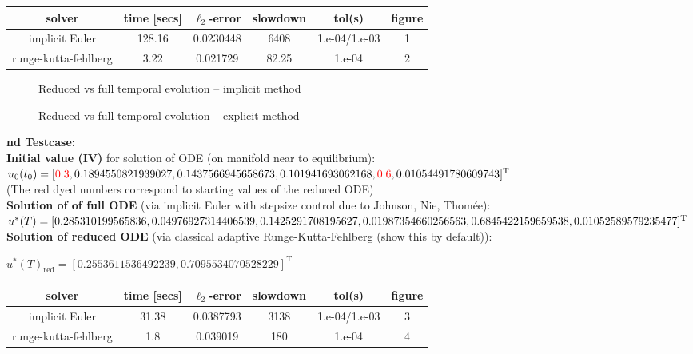 \documentclass[11pt,a4paper]{article}
\newcommand{\trans}{^{\operatorname{T}}}
\newcommand{\dyeitred}{\textcolor{red}}{}
\begin{document}
\begin{center}
  \begin{tabular}{|c|c|c|c|c||c|}
    \hline 
    \textbf{solver} &  \textbf{time [secs]} & \textbf{$\ell_2$-error} & \textbf{slowdown} & \textbf{tol(s)} &\textbf{figure}\\
\hline \hline
implicit Euler & 128.16 & 0.0230448 & 6408 & 1.e-04/1.e-03 &1\\
runge-kutta-fehlberg &3.22 & 0.021729 & 82.25 &  1.e-04 &2 \\
\hline
  \end{tabular}
\end{center}

\begin{figure}
  \caption{Reduced vs full temporal evolution -- implicit method}
\end{figure} 

\begin{figure}
  \caption{Reduced vs full temporal evolution -- explicit method}
\end{figure} 


\textbf{nd Testcase:}\\
\textbf{\textsf{Initial value (IV)}} for solution of ODE (on manifold near to equilibrium):\\
 $ u_0(t_0) = [\dyeitred{0.3}, 0.1894550821939027, 0.1437566945658673, \\0.101941693062168, \dyeitred{0.6}, 0.01054491780609743]\trans$\\
(The red dyed numbers correspond to starting values of the reduced ODE)\\
\textbf{\textsf{Solution of of full ODE}} (via implicit Euler with stepsize control due to Johnson, Nie, Thom\'ee): \\
$u^*(T) = [ 0.285310199565836, 0.04976927314406539, 0.1425291708195627, \\0.01987354660256563, 0.6845422159659538, 0.01052589579235477 ]\trans$\\
\textbf{\textsf{Solution of reduced ODE}} (via classical adaptive Runge-Kutta-Fehlberg (show this by default)):


$u^*(T)_{\mathrm{red}} = [ 0.2553611536492239, 0.7095534070528229 ]\trans$
\begin{center}
  \begin{tabular}{|c|c|c|c|c||c|}
    \hline 
    \textbf{solver} &  \textbf{time [secs]} & \textbf{$\ell_2$-error} & \textbf{slowdown} & \textbf{tol(s)} &\textbf{figure}\\
\hline \hline
implicit Euler & 31.38 & 0.0387793 & 3138 & 1.e-04/1.e-03 &3\\
runge-kutta-fehlberg &1.8 & 0.039019 & 180 &  1.e-04 &4 \\
\hline
  \end{tabular}
\end{center}
\end{document}

